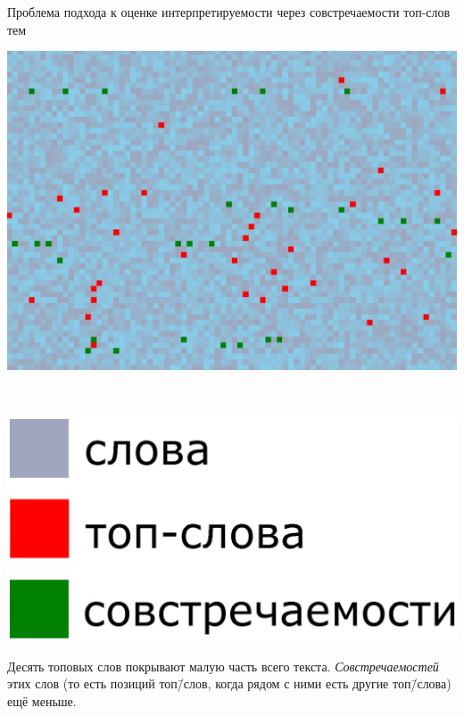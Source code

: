 \documentclass[russian]{beamer}
\begin{document}
\begin{frame}{Проблема подхода к оценке интерпретируемости через совстречаемости топ-слов тем}
  \begin{minipage}{0.70\textwidth}
    \includegraphics[width=\textwidth]{doc11358_topic0.jpg}
  \end{minipage}
  ~
  \begin{minipage}{0.25\textwidth}
    \includegraphics[width=\textwidth]{legend.eps}
  \end{minipage}
  \begin{block}{}
    Десять топовых слов покрывают малую часть всего текста.
    \emph{Совстречаемостей} этих слов (то есть позиций топ\=/слов, когда рядом с ними есть другие топ\=/слова) ещё меньше.
  \end{block}
\end{frame}
\end{document}

